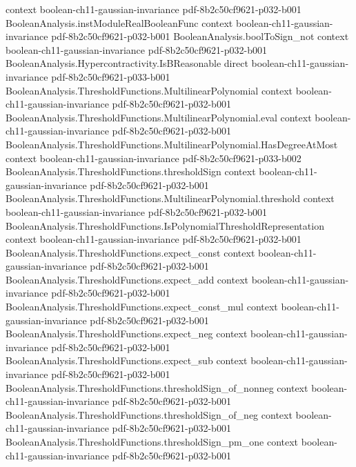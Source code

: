 \begin{theorem}
  {context}
  {boolean-ch11-gaussian-invariance}
  {pdf-8b2c50cf9621-p032-b001}
\proofstep
  {BooleanAnalysis.instModuleRealBooleanFunc}
  {context}
  {boolean-ch11-gaussian-invariance}
  {pdf-8b2c50cf9621-p032-b001}
\proofstep
  {BooleanAnalysis.boolToSign_not}
  {context}
  {boolean-ch11-gaussian-invariance}
  {pdf-8b2c50cf9621-p032-b001}
\proofstep
  {BooleanAnalysis.Hypercontractivity.IsBReasonable}
  {direct}
  {boolean-ch11-gaussian-invariance}
  {pdf-8b2c50cf9621-p033-b001}
\proofstep
  {BooleanAnalysis.ThresholdFunctions.MultilinearPolynomial}
  {context}
  {boolean-ch11-gaussian-invariance}
  {pdf-8b2c50cf9621-p032-b001}
\proofstep
  {BooleanAnalysis.ThresholdFunctions.MultilinearPolynomial.eval}
  {context}
  {boolean-ch11-gaussian-invariance}
  {pdf-8b2c50cf9621-p032-b001}
\proofstep
  {BooleanAnalysis.ThresholdFunctions.MultilinearPolynomial.HasDegreeAtMost}
  {context}
  {boolean-ch11-gaussian-invariance}
  {pdf-8b2c50cf9621-p033-b002}
\proofstep
  {BooleanAnalysis.ThresholdFunctions.thresholdSign}
  {context}
  {boolean-ch11-gaussian-invariance}
  {pdf-8b2c50cf9621-p032-b001}
\proofstep
  {BooleanAnalysis.ThresholdFunctions.MultilinearPolynomial.threshold}
  {context}
  {boolean-ch11-gaussian-invariance}
  {pdf-8b2c50cf9621-p032-b001}
\proofstep
  {BooleanAnalysis.ThresholdFunctions.IsPolynomialThresholdRepresentation}
  {context}
  {boolean-ch11-gaussian-invariance}
  {pdf-8b2c50cf9621-p032-b001}
\proofstep
  {BooleanAnalysis.ThresholdFunctions.expect_const}
  {context}
  {boolean-ch11-gaussian-invariance}
  {pdf-8b2c50cf9621-p032-b001}
\proofstep
  {BooleanAnalysis.ThresholdFunctions.expect_add}
  {context}
  {boolean-ch11-gaussian-invariance}
  {pdf-8b2c50cf9621-p032-b001}
\proofstep
  {BooleanAnalysis.ThresholdFunctions.expect_const_mul}
  {context}
  {boolean-ch11-gaussian-invariance}
  {pdf-8b2c50cf9621-p032-b001}
\proofstep
  {BooleanAnalysis.ThresholdFunctions.expect_neg}
  {context}
  {boolean-ch11-gaussian-invariance}
  {pdf-8b2c50cf9621-p032-b001}
\proofstep
  {BooleanAnalysis.ThresholdFunctions.expect_sub}
  {context}
  {boolean-ch11-gaussian-invariance}
  {pdf-8b2c50cf9621-p032-b001}
\proofstep
  {BooleanAnalysis.ThresholdFunctions.thresholdSign_of_nonneg}
  {context}
  {boolean-ch11-gaussian-invariance}
  {pdf-8b2c50cf9621-p032-b001}
\proofstep
  {BooleanAnalysis.ThresholdFunctions.thresholdSign_of_neg}
  {context}
  {boolean-ch11-gaussian-invariance}
  {pdf-8b2c50cf9621-p032-b001}
\proofstep
  {BooleanAnalysis.ThresholdFunctions.thresholdSign_pm_one}
  {context}
  {boolean-ch11-gaussian-invariance}
  {pdf-8b2c50cf9621-p032-b001}

\end{theorem}
